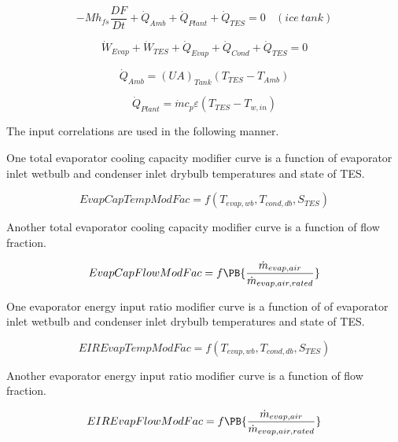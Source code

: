 \begin{equation}
-M{h_{fs}}\frac{{DF}}{{Dt}} + {\dot Q_{Amb}} + {\dot Q_{Plant}} + {\dot Q_{TES}} = 0 ~~~~ (ice~tank)
\end{equation}

\begin{equation}
{\dot W_{Evap}} + {\dot W_{TES}} + {\dot Q_{Evap}} + {\dot Q_{Cond}} + {\dot Q_{TES}} = 0
\end{equation}

\begin{equation}
{\dot Q_{Amb}} = {\left( {UA} \right)_{Tank}}\left( {{T_{TES}} - {T_{Amb}}} \right)
\end{equation}

\begin{equation}
  {\dot Q_{Plant}} = \dot m{c_p}\varepsilon \left( {{T_{TES}} - {T_{w,in}}} \right)
\end{equation}

The input correlations are used in the following manner.

One total evaporator cooling capacity modifier curve is a function of evaporator inlet wetbulb and condenser inlet drybulb temperatures and state of TES.

\begin{equation}
EvapCapTempModFac = f\left( {{T_{evap,wb}},{T_{cond,db}},{S_{TES}}} \right)
\end{equation}

Another total evaporator cooling capacity modifier curve is a function of flow fraction.

\begin{equation}
EvapCapFlowModFac = f\PB{\frac{\dot{m}_{evap,air}}{\dot{m}_{evap,air,rated}}}
\end{equation}

One evaporator energy input ratio modifier curve is a function of of evaporator inlet wetbulb and condenser inlet drybulb temperatures and state of TES.

\begin{equation}
EIREvapTempModFac = f\left( {{T_{evap,wb}},{T_{cond,db}},{S_{TES}}} \right)
\end{equation}

Another evaporator energy input ratio modifier curve is a function of flow fraction.

\begin{equation}
EIREvapFlowModFac = f\PB{\frac{\dot{m}_{evap,air}}{\dot{m}_{evap,air,rated}}}
\end{equation}

